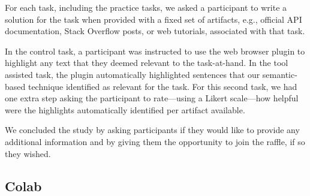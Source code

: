 {For each task, including the practice tasks, we asked a participant to write a solution for the task
when provided with a fixed set of artifacts, e.g., official API documentation, Stack Overflow posts, or web tutorials, 
associated with that task.  


In the control task, a participant was instructed to use the web browser plugin to highlight any text that they deemed relevant to the task-at-hand. 
In the tool assisted task, the plugin automatically highlighted sentences that our semantic-based technique identified as relevant for the task. 
For this second task, we had one extra step asking the participant to rate---using a Likert scale---how helpful were the highlights automatically identified per artifact available. 


We concluded the study by asking participants if they would like to provide any additional information and 
by giving them the opportunity to join the raffle, if so they wished. 











\subsection{Colab}
\label{cp6:environment}


}
